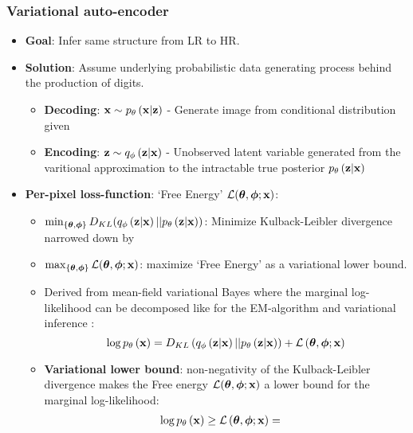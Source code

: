 \subsubsection{Variational auto-encoder} %
\label{ssub:variational_auto_encoder}
\begin{itemize}
	\item \textbf{Goal}: Infer same structure from LR to HR. 
	\item \textbf{Solution}: Assume underlying probabilistic data generating process behind the production of digits. 
	\begin{itemize}
		\item \textbf{Decoding}: $\bm{\mathrm{x}} \sim p_{\theta}\left(\bm{\mathrm{x}}|\bm{\mathrm{z}}\right)$ - Generate image from conditional distribution given
		\item \textbf{Encoding}: $\bm{\mathrm{z}} \sim q_{\phi}\left(\bm{\mathrm{z}}|\bm{\mathrm{x}}\right)$ - Unobserved latent variable generated from the varitional approximation to the intractable true posterior $p_{\theta}\left(\bm{\mathrm{z}}|\bm{\mathrm{x}}\right)$
	\end{itemize}
	\item \textbf{Per-pixel loss-function}: `Free Energy' $\mathcal{L}(\bm{\mathrm{\theta}},\bm{\mathrm{\phi}};\bm{\mathrm{x}})$:
	\begin{itemize}
		\item $\min_{\{\bm{\mathrm{\theta}},\bm{\mathrm{\phi}}\}} D_{KL}(q_{\phi}\left(\bm{\mathrm{z}}|\bm{\mathrm{x}}\right)||p_{\theta}\left(\bm{\mathrm{z}}|\bm{\mathrm{x}}\right))$: Minimize Kulback-Leibler divergence narrowed down by
		\item $\max_{\{\bm{\mathrm{\theta}},\bm{\mathrm{\phi}}\}}\mathcal{L}(\bm{\mathrm{\theta}},\bm{\mathrm{\phi}};\bm{\mathrm{x}})$: maximize `Free Energy' as a variational lower bound.
		\item Derived from mean-field variational Bayes where the marginal log-likelihood can be decomposed like for the EM-algorithm and variational inference \cite[\S10.2]{Bishop2006}:
		\begin{equation}
			\log p_{\theta}\left(\bm{\mathrm{x}}\right) = D_{KL}\left( q_{\phi}\left(\bm{\mathrm{z}}|\bm{\mathrm{x}}\right)||p_{\theta}\left(\bm{\mathrm{z}}|\bm{\mathrm{x}}\right)\right) + \mathcal{L}\left(\bm{\mathrm{\theta}},\bm{\mathrm{\phi}};\bm{\mathrm{x}}\right)
		\end{equation} 
		\item \textbf{Variational lower bound}: non-negativity of the Kulback-Leibler divergence makes the Free energy $\mathcal{L}(\bm{\mathrm{\theta}},\bm{\mathrm{\phi}};\bm{\mathrm{x}})$ a lower bound for the marginal log-likelihood:
			\begin{gather}
				\begin{split}
					\log \dec{\vec{x}} & \ge \mathcal{L}\left(\vec{\theta},\vec{\phi};\vec{x}\right) =

\end{split}
\end{gather}
\end{itemize}
\end{itemize}
